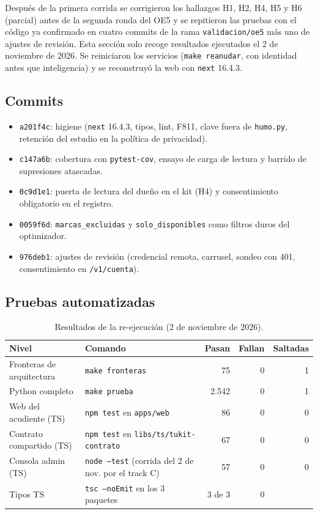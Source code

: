 \documentclass[11pt,letterpaper]{article}
\newcommand{\ruta}[1]{\texttt{\small #1}}
\begin{document}
Después de la primera corrida se corrigieron los hallazgos H1, H2, H4, H5 y H6 (parcial) antes de la segunda ronda
del OE5 y se repitieron las pruebas con el código ya confirmado en cuatro commits de la rama
\ruta{validacion/\allowbreak{}oe5} más uno de ajustes de revisión. Esta sección solo recoge resultados ejecutados el 2 de noviembre de 2026.
Se reiniciaron los servicios (\ruta{make reanudar}, con identidad antes que inteligencia) y se reconstruyó la web con
\ruta{next} 16.4.3.

\subsection{Commits}

\begin{itemize}
  \item \ruta{a201f4c}: higiene (\ruta{next} 16.4.3, tipos, lint, F811, clave fuera de \ruta{humo.py}, retención del estudio en la política de privacidad).
  \item \ruta{c147a6b}: cobertura con \ruta{pytest-cov}, ensayo de carga de lectura y barrido de supresiones atascadas.
  \item \ruta{0c9d1e1}: puerta de lectura del dueño en el kit (H4) y consentimiento obligatorio en el registro.
  \item \ruta{0059f6d}: \ruta{marcas\_\allowbreak{}excluidas} y \ruta{solo\_\allowbreak{}disponibles} como filtros duros del optimizador.
  \item \ruta{976deb1}: ajustes de revisión (credencial remota, carrusel, sondeo con 401, consentimiento en \ruta{/v1/cuenta}).
\end{itemize}

\subsection{Pruebas automatizadas}

\begin{table}[h]
\centering\small
\caption{Resultados de la re-ejecución (2 de noviembre de 2026).}
\begin{tabular}{L{5.2cm}L{4.6cm}rrr}
\toprule
Nivel & Comando & Pasan & Fallan & Saltadas \\
\midrule
Fronteras de arquitectura & \ruta{make fronteras} & 75 & 0 & 1 \\
Python completo & \ruta{make prueba} & 2.542 & 0 & 1 \\
Web del acudiente (TS) & \ruta{npm test} en \ruta{apps/\allowbreak{}web} & 86 & 0 & 0 \\
Contrato compartido (TS) & \ruta{npm test} en \ruta{libs/\allowbreak{}ts/\allowbreak{}tukit-contrato} & 67 & 0 & 0 \\
Consola admin (TS) & \ruta{node --test} (corrida del 2 de nov. por el track C) & 57 & 0 & 0 \\
Tipos TS & \ruta{tsc --noEmit} en los 3 paquetes & 3 de 3 & 0 & \\
\bottomrule
\end{tabular}
\end{table}
\end{document}
